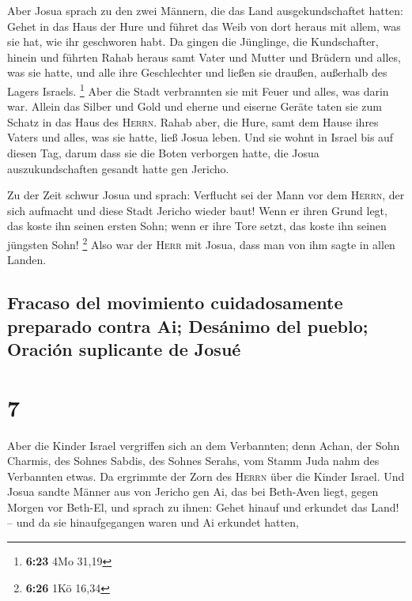  Aber Josua sprach zu den zwei Männern, die das Land
ausgekundschaftet hatten: Gehet in das Haus der Hure und führet das Weib
von dort heraus mit allem, was sie hat, wie ihr geschworen habt.
 Da gingen die Jünglinge, die Kundschafter, hinein und
führten Rahab heraus samt Vater und Mutter und Brüdern und alles, was
sie hatte, und alle ihre Geschlechter und ließen sie draußen, außerhalb
des Lagers Israels. \footnote{\textbf{6:23} 4Mo 31,19} 
Aber die Stadt verbrannten sie mit Feuer und alles, was darin war.
Allein das Silber und Gold und eherne und eiserne Geräte taten sie zum
Schatz in das Haus des \textsc{Herrn}.  Rahab aber, die
Hure, samt dem Hause ihres Vaters und alles, was sie hatte, ließ Josua
leben. Und sie wohnt in Israel bis auf diesen Tag, darum dass sie die
Boten verborgen hatte, die Josua auszukundschaften gesandt hatte gen
Jericho.

 Zu der Zeit schwur Josua und sprach: Verflucht sei der
Mann vor dem \textsc{Herrn}, der sich aufmacht und diese Stadt Jericho
wieder baut! Wenn er ihren Grund legt, das koste ihn seinen ersten Sohn;
wenn er ihre Tore setzt, das koste ihn seinen jüngsten Sohn! \footnote{\textbf{6:26}
  1Kö 16,34}  Also war der \textsc{Herr} mit Josua, dass
man von ihm sagte in allen Landen.

\hypertarget{fracaso-del-movimiento-cuidadosamente-preparado-contra-ai-desuxe1nimo-del-pueblo-oraciuxf3n-suplicante-de-josuuxe9}{%
\subsection{Fracaso del movimiento cuidadosamente preparado contra Ai;
Desánimo del pueblo; Oración suplicante de
Josué}\label{fracaso-del-movimiento-cuidadosamente-preparado-contra-ai-desuxe1nimo-del-pueblo-oraciuxf3n-suplicante-de-josuuxe9}}

\hypertarget{section-6}{%
\section{7}\label{section-6}}

 Aber die Kinder Israel vergriffen sich an dem Verbannten;
denn Achan, der Sohn Charmis, des Sohnes Sabdis, des Sohnes Serahs, vom
Stamm Juda nahm des Verbannten etwas. Da ergrimmte der Zorn des
\textsc{Herrn} über die Kinder Israel.  Und Josua sandte
Männer aus von Jericho gen Ai, das bei Beth-Aven liegt, gegen Morgen vor
Beth-El, und sprach zu ihnen: Gehet hinauf und erkundet das Land! -- und
da sie hinaufgegangen waren und Ai erkundet hatten,

